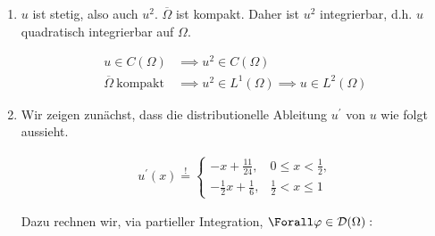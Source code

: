 \begin{solution}
\begin{enumerate}[label = \arabic*.]
\begin{enumerate}[label = (\roman*)]
    \item $u$ ist stetig, also auch $u^2$.
    $\overline{\Omega}$ ist kompakt.
    Daher ist $u^2$ integrierbar, d.h. $u$ quadratisch integrierbar auf $\Omega$.

    \begin{align*}
      u \in C(\Omega) & \implies u^2 \in C(\Omega) \\
      \overline{\Omega} ~\text{kompakt}~ & \implies u^2 \in L^1(\Omega) \implies u \in L^2(\Omega)
    \end{align*}

    \item Wir zeigen zunächst, dass die distributionelle Ableitung $u^\prime$ von $u$ wie folgt aussieht.

    \begin{align*}
      u^\prime(x)
      \stackrel{!}{=}
      \begin{cases}
        -x + \frac{11}{24},           & 0 \leq x < \frac{1}{2}, \\
        -\frac{1}{2} x + \frac{1}{6}, & \frac{1}{2} < x \leq 1
      \end{cases}
    \end{align*}

    Dazu rechnen wir, via partieller Integration, $\Forall \varphi \in \mathcal{D}(\Omega):$


\end{enumerate}
\end{enumerate}
\end{solution}
